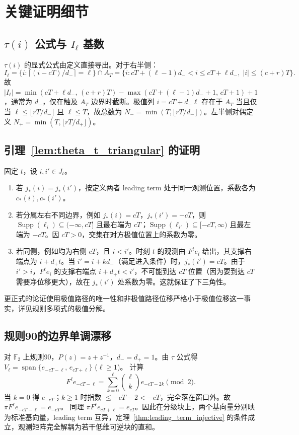 \documentclass[11pt,a4paper]{ctexart}
\newcommand{\F}{\mathbb{F}}
\DeclareMathOperator{\spanop}{span}
\DeclareMathOperator{\Supp}{Supp}
\begin{document}
\appendix
\section{关键证明细节}
\subsection{\(\tau(i)\) 公式与 \(I_\ell\) 基数}\label{sec:card_I}
\(\tau(i)\) 的显式公式由定义直接导出。对于右半侧：
\[
I_\ell = \{ i : \lceil(i-cT)/d_-\rceil = \ell \} \cap A_T
= \{ i : cT+(\ell-1)d_- < i \le cT+\ell d_-,\; |i|\le (c+r)T \}.
\]
故 \(|I_\ell| = \min(cT+\ell d_-,\,(c+r)T) - \max(cT+(\ell-1)d_-+1,\,cT+1) +1\)，通常为 \(d_-\)，仅在触及 \(A_T\) 边界时截断。极值列 \(i=cT+d_-\ell\) 存在于 \(A_T\) 当且仅当 \(\ell\le \lfloor rT/d_-\rfloor\) 且 \(\ell\le T\)，故总数为 \(N_-=\min(T,\lfloor rT/d_-\rfloor)\)。左半侧对偶定义 \(N_+=\min(T,\lfloor rT/d_+\rfloor)\)。

\subsection{引理~\ref{lem:theta_t_triangular} 的证明}\label{sec:leading_term_proof}
固定 \(t\)，设 \(i,i'\in J_t\)。
\begin{enumerate}[label=(\roman*)]
    \item 若 \(j_*(i)=j_*(i')\)，按定义两者 leading term 处于同一观测位置，系数各为 \(c_*(i),c_*(i')\)。
    \item 若分属左右不同边界，例如 \(j_*(i)=cT\)，\(j_*(i')=-cT\)，则 \(\Supp(\ell_i)\subseteq (-\infty, cT]\) 且最右端为 \(cT\)；\(\Supp(\ell_{i'})\subseteq [-cT,\infty)\) 且最左端为 \(-cT\)。因 \(cT>0\)，交集在对方极值位置上的系数为零。
    \item 若同侧，例如均为右侧 \(cT\)，且 \(i<i'\)。时刻 \(t\) 的观测由 \(F^t e_i\) 给出，其支撑右端点为 \(i+d_+ t\)。当 \(i' = i + k d_-\)（满足进入条件）时，\(j_*(i')=cT\)。由于 \(i'>i\)，\(F^t e_i\) 的支撑右端点 \(i+d_+ t < i'\)，不可能到达 \(cT\) 位置（因为要到达 \(cT\) 需要净位移更大），故在 \(j_*(i')\) 处系数为零。这就保证了下三角性。
\end{enumerate}
更正式的论证使用极值路径的唯一性和非极值路径位移严格小于极值位移这一事实，详见规则多项式的极值分解。

\subsection{规则90的边界单调漂移}\label{sec:rule90}
对 \(\F_2\) 上规则90，\(P(z)=z+z^{-1}\)，\(d_-=d_+=1\)。由 \(\tau\) 公式得 \(V_\ell=\spanop\{e_{-cT-\ell},\,e_{cT+\ell}\}\) (\(\ell\ge1\))。
计算
\[
F^\ell e_{-cT-\ell} = \sum_{k=0}^{\ell} \binom{\ell}{k} e_{-cT-2k}\pmod 2.
\]
当 \(k=0\) 得 \(e_{-cT}\)；\(k\ge1\) 时指数 \(\le -cT-2<-cT\)，完全落在窗口外。故 \(\pi F^\ell e_{-cT-\ell} = e_{-cT}\)。
同理 \(\pi F^\ell e_{cT+\ell}=e_{cT}\)。因此在分级块上，两个基向量分别映为标准基向量，leading term 互异，定理~\ref{thm:leading_term_injective} 的条件成立，观测矩阵完全解耦为若干低维可逆块的直和。
\end{document}
